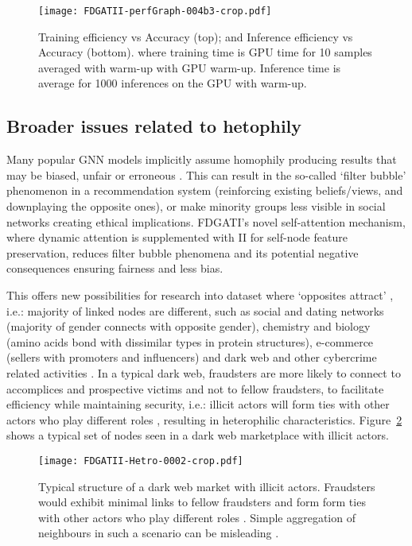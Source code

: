 \documentclass{article}
\begin{document}
\begin{figure}[h]
    \centering \texttt{[image: FDGATII-perfGraph-004b3-crop.pdf]}
\caption{Training efficiency vs Accuracy (top); and Inference efficiency vs Accuracy (bottom).  where training time is GPU time for 10 samples averaged with warm-up with GPU warm-up. Inference time is average for 1000 inferences on the GPU with warm-up.}
    \label{fig_performance}
\end{figure}

\subsection{Broader issues related to hetophily}
Many popular GNN models implicitly assume homophily producing results that may be biased, unfair or erroneous \cite{zhu2020beyond}. This can result in the so-called ‘filter bubble’ phenomenon  in a recommendation system (reinforcing existing beliefs/views, and downplaying the opposite ones), or make minority groups less visible in social networks creating ethical implications\cite{chitra2020analyzing}. FDGATI’s novel self-attention mechanism, where dynamic attention is supplemented with II for self-node feature preservation, reduces filter bubble phenomena and its potential negative consequences ensuring fairness and less bias.



This offers new possibilities for research into dataset where ‘opposites attract’ , i.e.: majority of linked nodes are different, such as social and dating networks (majority of gender connects with opposite gender), chemistry and biology (amino acids bond with dissimilar types in protein structures), e-commerce (sellers with promoters and influencers) and dark web and other cybercrime related activities \cite{zhu2020beyond}. In a typical dark web, fraudsters are more likely to connect to accomplices and prospective victims and not to fellow fraudsters, to facilitate efficiency while maintaining security, i.e.:  illicit actors will form ties with other actors who play different roles \cite{bright2019illicit}, resulting in heterophilic characteristics. Figure~\ref{fig_hetro} shows a typical set of nodes seen in a dark web marketplace with illicit actors.

\begin{figure}[h]
    \centering \texttt{[image: FDGATII-Hetro-0002-crop.pdf]} 
    \caption{Typical structure of a dark web market with illicit actors. Fraudsters would exhibit minimal links to fellow fraudsters and form form ties with other actors who play different roles \cite{bright2019illicit}. Simple aggregation of neighbours in such a scenario can be misleading \cite{alon2020bottleneck}.}
    \label{fig_hetro}
\end{figure}
\end{document}
